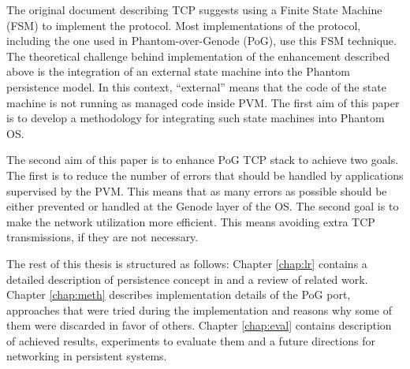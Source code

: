 The original document describing TCP \cite{john1981transmission} suggests using
a Finite State Machine (FSM) to implement the protocol. Most implementations of
the protocol, including the one used in Phantom-over-Genode (PoG), use this FSM
technique. The theoretical challenge behind implementation of the enhancement
described above is the integration of an external state machine into the
Phantom persistence model. In this context, “external” means that the code of
the state machine is not running as managed code inside PVM. The first aim of
this paper is to develop a methodology for integrating such state machines into
Phantom OS.  

The second aim of this paper is to enhance PoG TCP stack to achieve two goals.
The first is to reduce the number of errors that should be handled by
applications supervised by the PVM. This means that as many errors as possible
should be either prevented or handled at the Genode layer of the OS. The second
goal is to make the network utilization more efficient. This means avoiding
extra TCP transmissions, if they are not necessary.

The rest of this thesis is structured as follows:
Chapter \ref{chap:lr} contains a detailed description of persistence concept in
and a review of related work. Chapter \ref{chap:meth} describes implementation
details of the PoG port, approaches that were tried during the implementation
and reasons why some of them were discarded in favor of others. Chapter 
\ref{chap:eval} contains description of achieved results, experiments to
evaluate them and a future directions for networking in persistent systems.

